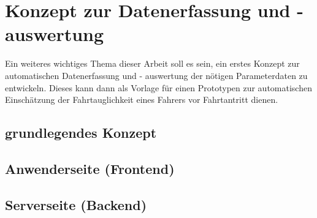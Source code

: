 \section{Konzept zur Datenerfassung und - auswertung}
\label{concept}
Ein weiteres wichtiges Thema dieser Arbeit soll es sein, ein erstes Konzept zur automatischen Datenerfassung und - auswertung der nötigen Parameterdaten zu entwickeln. Dieses kann dann als Vorlage für einen Prototypen zur automatischen Einschätzung der Fahrtauglichkeit eines Fahrers vor Fahrtantritt dienen. 

\subsection{grundlegendes Konzept}
\subsection{Anwenderseite (Frontend)}

\subsection{Serverseite (Backend)}